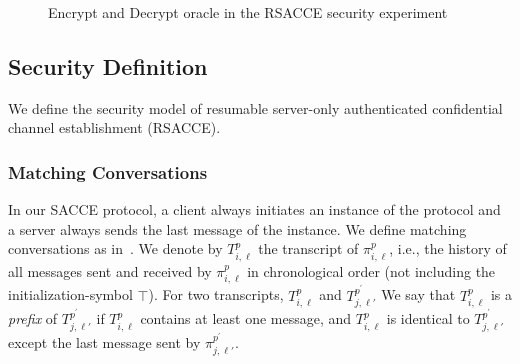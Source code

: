 \begin{figure*}[!htb]
\begin{center}
\caption{Encrypt and Decrypt oracle in the RSACCE security experiment}
 \label{fig:LHAE_rsacce}
\end{center}
\end{figure*}

\subsection{Security Definition} \label{sec:sec_def}

We define the security model of resumable server-only authenticated confidential channel establishment
(RSACCE).

\subsubsection{Matching Conversations}
In our SACCE protocol, a client always initiates an instance of the protocol and
a server always sends the last message of the instance.
We define matching conversations as in~\cite{JKSS12:ACCE}.
We denote by $T^p_{i,\ell}$ the transcript of $\pi^p_{i,\ell}$, i.e., the history of
all messages sent and received by $\pi^p_{i,\ell}$ in chronological order (not including the initialization-symbol $\top$).
For two transcripts, $T^p_{i,\ell}$ and $T^{p^{\prime}}_{j,\ell'}$
We say that $T^p_{i,\ell}$ is a \textit{prefix} of $T^{p^{\prime}}_{j,\ell'}$ if
$T^p_{i,\ell}$ contains at least one message, and
$T^p_{i,\ell}$ is identical to $T^{p^{\prime}}_{j,\ell'}$ except the last message sent
by $\pi^{p^{\prime}}_{j,\ell'}$.

